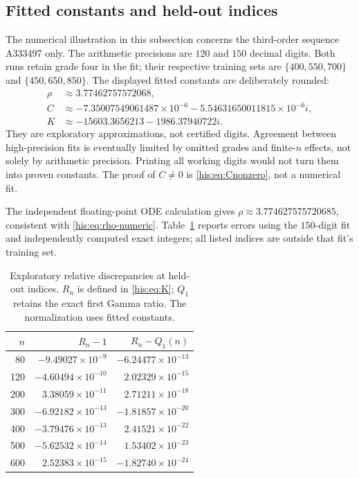 \documentclass[11pt]{article}
\theoremstyle{remark}\newtheorem{remark}[theorem]{Remark}
\numberwithin{equation}{section}
\begin{document}
\subsection{Fitted constants and held-out indices}
The numerical illustration in this subsection concerns the third-order sequence A333497 only. The arithmetic precisions are $120$ and $150$ decimal digits. Both runs retain grade four in the fit; their respective training sets are $\{400,550,700\}$ and $\{450,650,850\}$. The displayed fitted constants are deliberately rounded:
\begin{align}
 \rho&\approx3.77462757572068,\label{his:eq:rho-numeric}\\
 C&\approx-7.35007549061487\times10^{-6}
          -5.54631650011815\times10^{-6}i,\nonumber\\
 K&\approx-15603.3656213-1986.37940722i.\nonumber
\end{align}
They are exploratory approximations, not certified digits. Agreement between high-precision fits is eventually limited by omitted grades and finite-$n$ effects, not solely by arithmetic precision. Printing all working digits would not turn them into proven constants. The proof of $C\ne0$ is \eqref{his:eq:Cnonzero}, not a numerical fit.

The independent floating-point ODE calculation gives $\rho\approx3.774627575720685$, consistent with \eqref{his:eq:rho-numeric}. Table~\ref{his:tab:checks} reports errors using the $150$-digit fit and independently computed exact integers; all listed indices are outside that fit's training set.
\begin{table}[htbp]
\centering
\caption{Exploratory relative discrepancies at held-out indices. $R_n$ is defined in \eqref{his:eq:K}; $Q_1$ retains the exact first Gamma ratio. The normalization uses fitted constants.}\label{his:tab:checks}
\begin{tabular}{r rr}
\toprule
$n$ & $R_n-1$ & $R_n-Q_1(n)$\\
\midrule
80  & $-9.49027\times10^{-9}$  & $-6.24477\times10^{-13}$\\
120 & $-4.60494\times10^{-10}$ & $ 2.02329\times10^{-15}$\\
200 & $ 3.38059\times10^{-11}$ & $ 2.71211\times10^{-18}$\\
300 & $-6.92182\times10^{-13}$ & $-1.81857\times10^{-20}$\\
400 & $-3.79476\times10^{-13}$ & $ 2.41521\times10^{-22}$\\
500 & $-5.62532\times10^{-14}$ & $ 1.53402\times10^{-23}$\\
600 & $ 2.52383\times10^{-15}$ & $-1.82740\times10^{-24}$\\
\bottomrule
\end{tabular}
\end{table}
\end{document}
